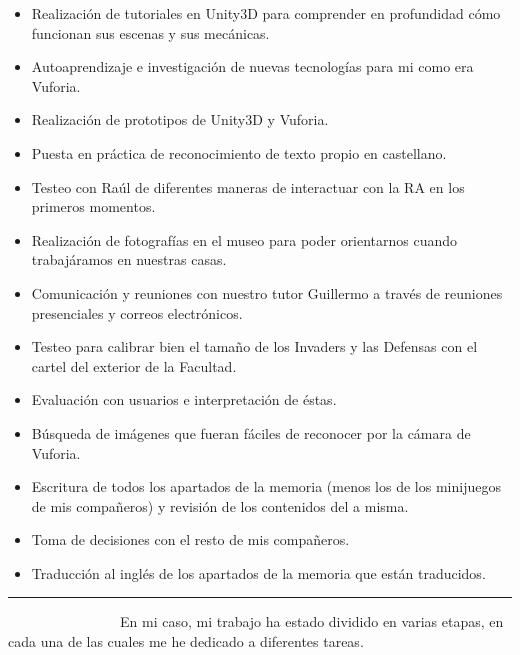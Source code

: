 \begin{itemize}
\itemsep1pt\parskip0pt
\item
  Realización de tutoriales en Unity3D para comprender en profundidad
  cómo funcionan sus escenas y sus mecánicas.
\item
  Autoaprendizaje e investigación de nuevas tecnologías para mi como era
  Vuforia.
\item
  Realización de prototipos de Unity3D y Vuforia.
\item
  Puesta en práctica de reconocimiento de texto propio en castellano.
\item
  Testeo con Raúl de diferentes maneras de interactuar con la RA en los
  primeros momentos.
\item
  Realización de fotografías en el museo para poder orientarnos cuando
  trabajáramos en nuestras casas.
\item
  Comunicación y reuniones con nuestro tutor Guillermo a través de
  reuniones presenciales y correos electrónicos.
\item
  Testeo para calibrar bien el tamaño de los Invaders y las Defensas con
  el cartel del exterior de la Facultad.
\item
  Evaluación con usuarios e interpretación de éstas.
\item
  Búsqueda de imágenes que fueran fáciles de reconocer por la cámara de
  Vuforia.
\item
  Escritura de todos los apartados de la memoria (menos los de los
  minijuegos de mis compañeros) y revisión de los contenidos del a
  misma.
\item
  Toma de decisiones con el resto de mis compañeros.
\item
  Traducción al inglés de los apartados de la memoria que están
  traducidos.
\end{itemize}

\begin{center}\rule{3in}{0.4pt}\end{center}


~~~~~~~~~~~~~~~~En mi caso, mi trabajo ha estado dividido en varias
etapas, en cada una de las cuales me he dedicado a diferentes tareas.

